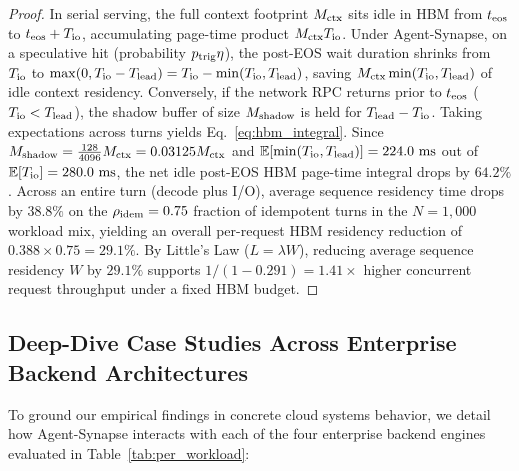 \documentclass[10pt,conference]{IEEEtran}
\begin{document}
\begin{proof}
In serial serving, the full context footprint $M_{\textnormal{ctx}}$ sits idle in HBM from $t_{\textnormal{eos}}$ to $t_{\textnormal{eos}} + T_{\textnormal{io}}$, accumulating page-time product $M_{\textnormal{ctx}} T_{\textnormal{io}}$. Under Agent-Synapse, on a speculative hit (probability $p_{\textnormal{trig}} \eta$), the post-EOS wait duration shrinks from $T_{\textnormal{io}}$ to $\max(0, T_{\textnormal{io}} - T_{\textnormal{lead}}) = T_{\textnormal{io}} - \min(T_{\textnormal{io}}, T_{\textnormal{lead}})$, saving $M_{\textnormal{ctx}} \min(T_{\textnormal{io}}, T_{\textnormal{lead}})$ of idle context residency. Conversely, if the network RPC returns prior to $t_{\textnormal{eos}}$ ($T_{\textnormal{io}} < T_{\textnormal{lead}}$), the shadow buffer of size $M_{\textnormal{shadow}}$ is held for $T_{\textnormal{lead}} - T_{\textnormal{io}}$. Taking expectations across turns yields Eq.~\eqref{eq:hbm_integral}. Since $M_{\textnormal{shadow}} = \frac{128}{4096} M_{\textnormal{ctx}} = 0.03125 M_{\textnormal{ctx}}$ and $\mathbb{E}[\min(T_{\textnormal{io}}, T_{\textnormal{lead}})] = 224.0\text{ ms}$ out of $\mathbb{E}[T_{\textnormal{io}}] = 280.0\text{ ms}$, the net idle post-EOS HBM page-time integral drops by $64.2\%$. Across an entire turn (decode plus I/O), average sequence residency time drops by $38.8\%$ on the $\rho_{\textnormal{idem}} = 0.75$ fraction of idempotent turns in the $N = 1{,}000$ workload mix, yielding an overall per-request HBM residency reduction of $0.388 \times 0.75 = 29.1\%$. By Little's Law ($L = \lambda W$), reducing average sequence residency $W$ by $29.1\%$ supports $1 / (1 - 0.291) = 1.41\times$ higher concurrent request throughput under a fixed HBM budget.
\end{proof}

\subsection{Deep-Dive Case Studies Across Enterprise Backend Architectures}
To ground our empirical findings in concrete cloud systems behavior, we detail how Agent-Synapse interacts with each of the four enterprise backend engines evaluated in Table~\ref{tab:per_workload}:
\end{document}
